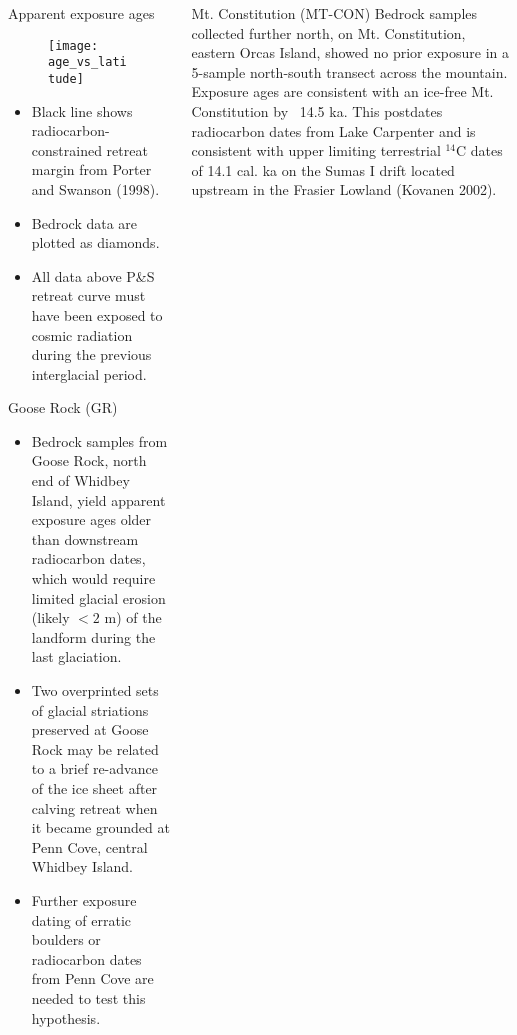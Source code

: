 \documentclass{beamer}
\begin{document}
\begin{frame}{}
\begin{columns}[T]
\begin{column}{.32\columnwidth}
\begin{block}{Apparent exposure ages}
\begin{figure}
\texttt{[image: age\_vs\_latitude]}
\end{figure}

\begin{itemize}
\item Black line shows radiocarbon-constrained retreat margin from Porter and Swanson (1998).
\item Bedrock data are plotted as diamonds.
\item All data above P\&S retreat curve must have been exposed to cosmic radiation during the previous interglacial period.
\end{itemize}

\end{block}

\begin{block}{Goose Rock (GR)}
\begin{itemize}
\item Bedrock samples from Goose Rock, north end of Whidbey Island, yield apparent exposure ages older than downstream radiocarbon dates, which would require limited glacial erosion (likely $<2$ m) of the landform during the last glaciation.
\item Two overprinted sets of glacial striations preserved at Goose Rock may be related to a brief re-advance of the ice sheet after calving retreat when it became grounded at Penn Cove, central Whidbey Island.
\item Further exposure dating of erratic boulders or radiocarbon dates from Penn Cove are needed to test this hypothesis. 
\end{itemize}	
\end{block}

\end{column}

\begin{column}{.32\columnwidth}

\begin{block}{Mt. Constitution (MT-CON)}
Bedrock samples collected further north, on Mt. Constitution, eastern Orcas Island, showed no prior exposure in a 5-sample north-south transect across the mountain. Exposure ages are consistent with an ice-free Mt. Constitution by ~14.5 ka. 
This postdates radiocarbon dates from Lake Carpenter and is consistent with upper limiting terrestrial $^{14}$C dates of 14.1 cal. ka on the Sumas I drift located upstream in the Frasier Lowland (Kovanen 2002).
\end{block}



\end{column}
\end{columns}
\end{frame}
\end{document}
